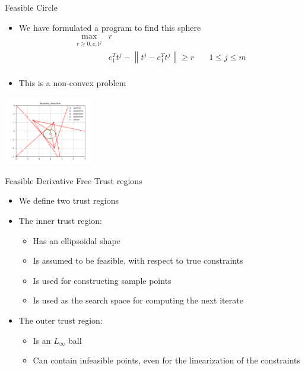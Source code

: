 \documentclass{beamer}
\begin{document}
\begin{frame}{Feasible Circle}
\begin{itemize}
	\item We have formulated a program to find this sphere
		\begin{align*}
\max_{r \ge 0, c, t^j}	& r & \\
					&  e_1^T t^j - \left\|t^j - e_1^T t^j\right\| \ge r			& \quad 1 \le j \le m \\
		\end{align*}
	\item This is a non-convex problem
\end{itemize}
\begin{center}
\includegraphics[width=150px]{images/feasible_sphere.png}
\end{center}
\end{frame}


\begin{frame}{Feasible Derivative Free Trust regions}
    \begin{itemize}
        \item We define two trust regions
        \item The inner trust region:
            \begin{itemize}
                \item Has an ellipsoidal shape
                \item Is assumed to be feasible, with respect to true constraints
                \item Is used for constructing sample points
                \item Is used as the search space for computing the next iterate
            \end{itemize}
        \item The outer trust region:
            \begin{itemize}
                \item Is an $L_{\infty}$ ball
                \item Can contain infeasible points, even for the linearization of the constraints
            \end{itemize}
    \end{itemize}
\end{frame}
\end{document}
